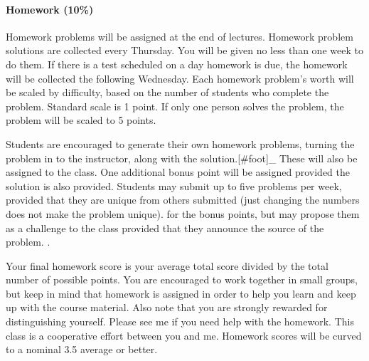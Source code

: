 \documentclass[letterpaper,10pt,english]{sphinxmanual}
\begin{document}
\paragraph{Homework (10\%)}
\label{\detokenize{classes/ME7690Syll:homework-10}}
Homework problems will be assigned at the end of lectures.  Homework problem solutions are collected every Thursday. You will be given no less than one week to do them. If there is a test scheduled on a day homework is due, the homework will be collected the following Wednesday. Each homework problem’s worth will be scaled by difficulty, based on the number of students who complete the problem. Standard scale is 1 point. If only one person solves the problem, the problem will be scaled to 5 points.

Students are encouraged to generate their own homework problems, turning the problem in to the instructor, along with the solution.{[}\#foot{]}\_ These will also be assigned to the class. One additional bonus point will be assigned provided the solution is also provided. Students may submit up to five problems per week, provided that they are unique from others submitted (just changing the numbers does not make the problem unique).  for the bonus points, but may propose them as a challenge to the class provided that they announce the source of the problem. .

Your final homework score is your average total score divided by the total number of possible points. You are encouraged to work together in small groups, but keep in mind that homework is assigned in order to help you learn and keep up with the course material. Also note that you are strongly rewarded for distinguishing yourself. Please see me if you need help with the homework. This class is a cooperative effort between you and me. Homework scores will be curved to a nominal 3.5 average or better.
\end{document}
